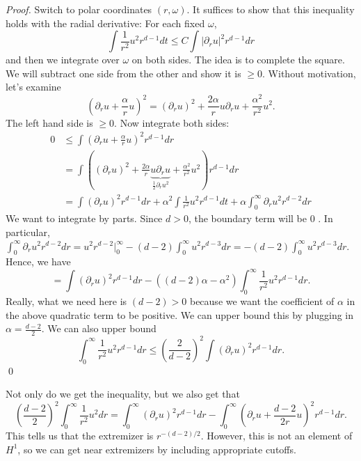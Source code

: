 \begin{proof}
    Switch to polar coordinates $(r, \omega)$. It suffices to show that this inequality holds with the radial derivative: For each fixed $\omega$,
    $$
    \int \frac{1}{r^{2}} u^{2} r^{d-1} d t \leq C \int\left|\partial_{r} u\right|^{2} r^{d-1} d r
    $$
    and then we integrate over $\omega$ on both sides. The idea is to complete the square. We will subtract one side from the other and show it is $\geq 0$. Without motivation, let's examine
    $$
    \left(\partial_{r} u+\frac{\alpha}{r} u\right)^{2}=\left(\partial_{r} u\right)^{2}+\frac{2 \alpha}{r} u \partial_{r} u+\frac{\alpha^{2}}{r^{2}} u^{2} .
    $$
    The left hand side is $\geq 0$. Now integrate both sides:
    $$
    \begin{aligned}
    0 & \leq \int\left(\partial_{r} u+\frac{\alpha}{r} u\right)^{2} r^{d-1} d r \\
    &=\int(\left(\partial_{r} u\right)^{2}+\frac{2 \alpha}{r} \underbrace{u \partial_{r} u}_{\frac{1}{2} \partial_{r} u^{2}}+\frac{\alpha^{2}}{r^{2}} u^{2}) r^{d-1} d r \\
    &=\int\left(\partial_{r} u\right)^{2} r^{d-1} d r+\alpha^{2} \int \frac{1}{r^{2}} u^{2} r^{d-1} d t+\alpha \int_{0}^{\infty} \partial_{r} u^{2} r^{d-2} d r
    \end{aligned}
    $$
    We want to integrate by parts. Since $d>0$, the boundary term will be 0 . In particular, $\int_{0}^{\infty} \partial_{r} u^{2} r^{d-2} d r= u^{2} r^{d-2} |_{0}^{\infty}-(d-2) \int_{0}^{\infty} u^{2} r^{d-3} d r = -(d-2) \int_{0}^{\infty} u^{2} r^{d-3} d r.$ Hence, we have 
    \[
        =\int\left(\partial_{r} u\right)^{2} r^{d-1} d r-\left((d-2) \alpha-\alpha^{2}\right) \int_{0}^{\infty} \frac{1}{r^{2}} u^{2} r^{d-1} d r.
    \]
    Really, what we need here is $(d-2)>0$ because we want the coefficient of $\alpha$ in the above quadratic term to be positive. We can upper bound this by plugging in $\alpha=\frac{d-2}{2}$. We can also upper bound 
    \[
        \int_{0}^{\infty} \frac{1}{r^{2}} u^{2} r^{d-1} d r \leq\left(\frac{2}{d-2}\right)^{2} \int\left(\partial_{r} u\right)^{2} r^{d-1} d r.  
    \]
    \qed 
\end{proof}

\begin{remark}
    Not only do we get the inequality, but we also get that
    $$
    \left(\frac{d-2}{2}\right)^{2} \int_{0}^{\infty} \frac{1}{r^{2}} u^{2} d r=\int_{0}^{\infty}\left(\partial_{r} u\right)^{2} r^{d-1} d r-\int_{0}^{\infty}\left(\partial_{r} u+\frac{d-2}{2 r} u\right)^{2} r^{d-1} d r .
    $$
    This tells us that the extremizer is $r^{-(d-2) / 2}$. However, this is not an element of $H^{1}$, so we can get near extremizers by including appropriate cutoffs.
\end{remark}

